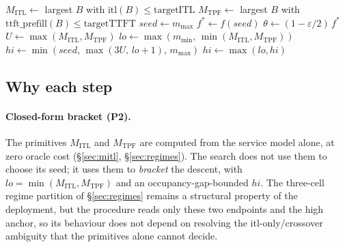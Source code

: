 \begin{algorithm}[t]
  \DontPrintSemicolon
  $M_{\mathrm{ITL}} \leftarrow$ largest $B$ with $\mathrm{itl}(B) \le \mathrm{targetITL}$
  $M_{\mathrm{TPF}} \leftarrow$ largest $B$ with $\mathrm{ttft\_prefill}(B) \le \mathrm{targetTTFT}$\;
  $\mathit{seed} \leftarrow m_{\max}$ 
  $f^\ast \leftarrow f(\mathit{seed})$ 
  $\theta \leftarrow (1 - \varepsilon/2)\, f^\ast$ 
  $U \leftarrow \max(M_{\mathrm{ITL}}, M_{\mathrm{TPF}})$\;
  $\mathit{lo} \leftarrow \max(m_{\min},\, \min(M_{\mathrm{ITL}}, M_{\mathrm{TPF}}))$\;
  $\mathit{hi} \leftarrow \min(\mathit{seed},\, \max(3U,\, \mathit{lo}+1),\, m_{\max})$
  $\mathit{hi} \leftarrow \max(\mathit{lo}, \mathit{hi})$\;
  \Return {}
  \BlankLine
  \caption{\textsc{FormulaGuidedOnsetSearch} ($\textsc{MaxIters}=6$); the
           bracketed search is \textsc{Bisect}, a bounded monotone-predicate
           binary search.}
  \label{alg:onset}
\end{algorithm}

\subsection{Why each step}
\label{sec:algo-rationale}

\paragraph{Closed-form bracket (P2).}
The primitives $M_{\mathrm{ITL}}$ and $M_{\mathrm{TPF}}$ are computed from the service
model alone, at zero oracle cost (\S\ref{sec:mitl}, \S\ref{sec:regimes}). The search does
not use them to choose its seed; it uses them to \emph{bracket} the descent, with
$\mathit{lo} = \min(M_{\mathrm{ITL}}, M_{\mathrm{TPF}})$ and an occupancy-gap-bounded
$\mathit{hi}$. The three-cell regime partition of \S\ref{sec:regimes} remains a structural
property of the deployment, but the procedure reads only these two endpoints and the high
anchor, so its behaviour does not depend on resolving the itl-only/crossover ambiguity that
the primitives alone cannot decide.

